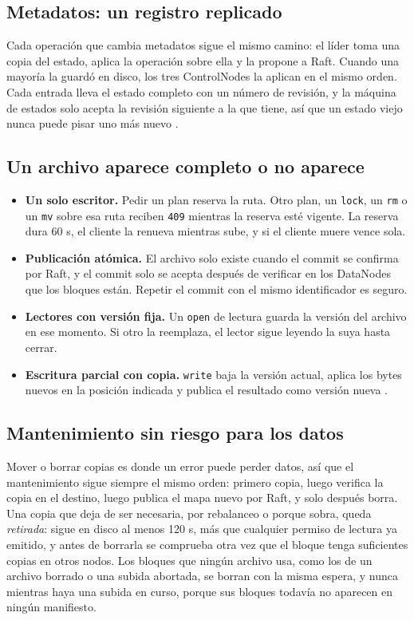 \documentclass[10pt]{article}
\begin{document}
\subsection{Metadatos: un registro replicado}

Cada operación que cambia metadatos sigue el mismo camino: el líder toma una copia del estado, aplica la operación sobre ella y la propone a Raft. Cuando una mayoría la guardó en disco, los tres ControlNodes la aplican en el mismo orden. Cada entrada lleva el estado completo con un número de revisión, y la máquina de estados solo acepta la revisión siguiente a la que tiene, así que un estado viejo nunca puede pisar uno más nuevo .

\subsection{Un archivo aparece completo o no aparece}

\begin{itemize}
\item \textbf{Un solo escritor.} Pedir un plan reserva la ruta. Otro plan, un \texttt{lock}, un \texttt{rm} o un \texttt{mv} sobre esa ruta reciben \texttt{409} mientras la reserva esté vigente. La reserva dura 60 s, el cliente la renueva mientras sube, y si el cliente muere vence sola.
\item \textbf{Publicación atómica.} El archivo solo existe cuando el commit se confirma por Raft, y el commit solo se acepta después de verificar en los DataNodes que los bloques están. Repetir el commit con el mismo identificador es seguro.
\item \textbf{Lectores con versión fija.} Un \texttt{open} de lectura guarda la versión del archivo en ese momento. Si otro la reemplaza, el lector sigue leyendo la suya hasta cerrar.
\item \textbf{Escritura parcial con copia.} \texttt{write} baja la versión actual, aplica los bytes nuevos en la posición indicada y publica el resultado como versión nueva .
\end{itemize}

\subsection{Mantenimiento sin riesgo para los datos}

Mover o borrar copias es donde un error puede perder datos, así que el mantenimiento sigue siempre el mismo orden: primero copia, luego verifica la copia en el destino, luego publica el mapa nuevo por Raft, y solo después borra. Una copia que deja de ser necesaria, por rebalanceo o porque sobra, queda \emph{retirada}: sigue en disco al menos 120 s, más que cualquier permiso de lectura ya emitido, y antes de borrarla se comprueba otra vez que el bloque tenga suficientes copias en otros nodos. Los bloques que ningún archivo usa, como los de un archivo borrado o una subida abortada, se borran con la misma espera, y nunca mientras haya una subida en curso, porque sus bloques todavía no aparecen en ningún manifiesto.
\end{document}
